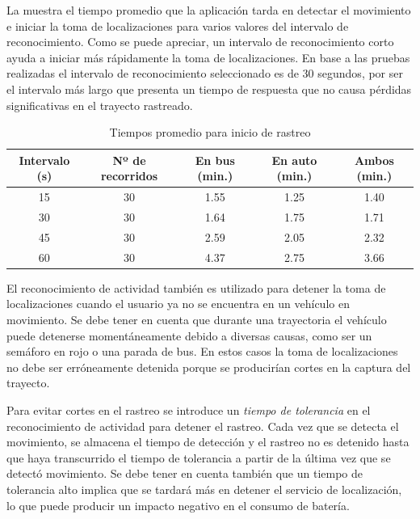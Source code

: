 La  muestra el tiempo promedio que la aplicación tarda en detectar el movimiento e iniciar la toma de localizaciones para varios valores del intervalo de reconocimiento. Como se puede apreciar, un intervalo de reconocimiento corto ayuda a iniciar más rápidamente la toma de localizaciones. En base a las pruebas realizadas el intervalo de reconocimiento seleccionado es de 30 segundos, por ser el intervalo más largo que presenta un tiempo de respuesta que no causa pérdidas significativas en el trayecto rastreado.


\begin{table}[h]
  \centering
	\begin{tabular}{ccccc}
	\toprule
	Intervalo (s) & Nº de recorridos & En bus (min.) & En auto (min.) & Ambos (min.) \\
	\midrule
	15            & 30       & 1.55         & 1.25            & 1.40         \\
	30            & 30       & 1.64         & 1.75            & 1.71         \\
	45            & 30       & 2.59         & 2.05            & 2.32         \\
	60            & 30       & 4.37         & 2.75            & 3.66         \\
	\bottomrule
	\end{tabular}
  \caption{Tiempos promedio para inicio de rastreo}
  \label{tab:prom_intervalo_reconocimiento}
\end{table}


El reconocimiento de actividad también es utilizado para detener la toma de localizaciones cuando el usuario ya no se encuentra en un vehículo en movimiento. Se debe tener en cuenta que durante una trayectoria el vehículo puede detenerse momentáneamente debido a diversas causas, como ser un semáforo en rojo o una parada de bus. En estos casos la toma de localizaciones no debe ser erróneamente detenida porque se producirían cortes en la captura del trayecto. 

Para evitar cortes en el rastreo se introduce un \emph{tiempo de tolerancia} en el reconocimiento de actividad para detener el rastreo. Cada vez que se detecta el movimiento, se almacena el tiempo de detección y el rastreo no es detenido hasta que haya transcurrido el tiempo de tolerancia a partir de la última vez que se detectó movimiento. Se debe tener en cuenta también que un tiempo de tolerancia alto implica que se tardará más en detener el servicio de localización, lo que puede producir un impacto negativo en el consumo de batería.

